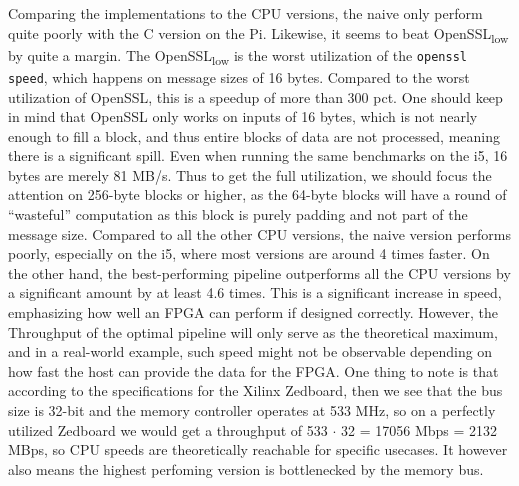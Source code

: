 \documentclass[a4paper, openany]{book}
\begin{document}
Comparing the implementations to the CPU versions, the naive only perform quite poorly with the C version on the Pi. Likewise, it seems to beat OpenSSL\textsubscript{low} by quite a margin. The OpenSSL\textsubscript{low} is the worst utilization of the \texttt{openssl speed}, which happens on message sizes of 16 bytes. Compared to the worst utilization of OpenSSL, this is a speedup of more than 300 pct. One should keep in mind that OpenSSL only works on inputs of 16 bytes, which is not nearly enough to fill a block, and thus entire blocks of data are not processed, meaning there is a significant spill. Even when running the same benchmarks on the i5, 16 bytes are merely 81 MB/s. Thus to get the full utilization, we should focus the attention on 256-byte blocks or higher, as the 64-byte blocks will have a round of ``wasteful'' computation as this block is purely padding and not part of the message size.
Compared to all the other CPU versions, the naive version performs poorly, especially on the i5, where most versions are around 4 times faster. On the other hand, the best-performing pipeline outperforms all the CPU versions by a significant amount by at least 4.6 times. This is a significant increase in speed, emphasizing how well an FPGA can perform if designed correctly. However, the Throughput of the optimal pipeline will only serve as the theoretical maximum, and in a real-world example, such speed might not be observable depending on how fast the host can provide the data for the FPGA.
One thing to note is that according to the specifications for the Xilinx Zedboard\cite{ZedSpec}, then we see that the bus size is 32-bit and the memory controller operates at 533 MHz,
so on a perfectly utilized Zedboard we would get a throughput of 533 \(\cdot\) 32 = 17056 Mbps = 2132 MBps, so CPU speeds are theoretically reachable for specific usecases. It however also means the highest perfoming version is bottlenecked by the memory bus.
\end{document}
